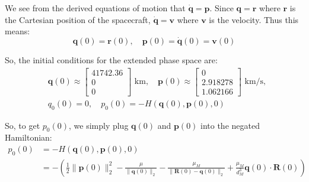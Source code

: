 \documentclass[titlepage]{article}
\begin{document}
We see from the derived equations of motion that $\dot{\boldsymbol{q}}=\boldsymbol{p}$. Since $\boldsymbol{q}=\boldsymbol{r}$ where $\boldsymbol{r}$ is the Cartesian position of the spacecraft, $\dot{\boldsymbol{q}}=\boldsymbol{v}$ where $\boldsymbol{v}$ is the velocity. Thus this means:
\begin{equation}
	\boldsymbol{q}(0)=\boldsymbol{r}(0),\quad\boldsymbol{p}(0)=\dot{\boldsymbol{q}}(0)=\boldsymbol{v}(0)
\end{equation}

So, the initial conditions for the extended phase space are:
\begin{equation}
	\begin{split}
		&\boldsymbol{q}(0)\approx
		\begin{bmatrix}
			41742.36 \\
			0 \\
			0
		\end{bmatrix}\text{ km},\quad
		\boldsymbol{p}(0)\approx
		\begin{bmatrix}
			0 \\
			2.918278 \\
			1.062166
		\end{bmatrix}\text{ km/s}, \\
		&q_0(0)=0,\quad
		p_0(0)=-H(\boldsymbol{q}(0),\boldsymbol{p}(0),0)
	\end{split}
\end{equation}

So, to get $p_0(0)$, we simply plug $\boldsymbol{q}(0)$ and $\boldsymbol{p}(0)$ into the negated Hamiltonian:
\begin{equation}
	\begin{split}
		p_0(0)&=-H(\boldsymbol{q}(0),\boldsymbol{p}(0),0) \\
		&=-\left(\frac{1}{2}\|\boldsymbol{p}(0)\|_2^2-\frac{\mu}{\|\boldsymbol{q}(0)\|_2}-\frac{\mu_M}{\|\boldsymbol{R}(0)-\boldsymbol{q}(0)\|_2}+\frac{\mu_M}{d_M^3}\boldsymbol{q}(0)\cdot\boldsymbol{R}(0)\right)
	\end{split}
\end{equation}
\end{document}
